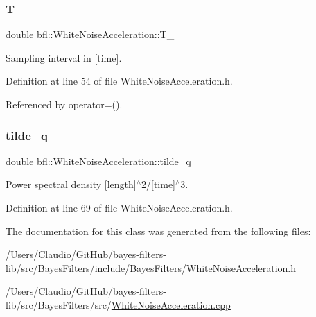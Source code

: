 \subsubsection{\texorpdfstring{T\+\_\+}{T\_}}
{\footnotesize\ttfamily double bfl\+::\+White\+Noise\+Acceleration\+::\+T\+\_\+\hspace{0.3cm}{\ttfamily [protected]}}



Sampling interval in \mbox{[}time\mbox{]}. 



Definition at line 54 of file White\+Noise\+Acceleration.\+h.



Referenced by operator=().

\mbox{\label{classbfl_1_1WhiteNoiseAcceleration_ab65b133705fba509b0cf3675379573e6}} 
\subsubsection{\texorpdfstring{tilde\+\_\+q\+\_\+}{tilde\_q\_}}
{\footnotesize\ttfamily double bfl\+::\+White\+Noise\+Acceleration\+::tilde\+\_\+q\+\_\+\hspace{0.3cm}{\ttfamily [protected]}}



Power spectral density \mbox{[}length\mbox{]}$^\wedge$2/\mbox{[}time\mbox{]}$^\wedge$3. 



Definition at line 69 of file White\+Noise\+Acceleration.\+h.



The documentation for this class was generated from the following files\+:\begin{DoxyCompactItemize}
\item 
/\+Users/\+Claudio/\+Git\+Hub/bayes-\/filters-\/lib/src/\+Bayes\+Filters/include/\+Bayes\+Filters/\mbox{\hyperlink{WhiteNoiseAcceleration_8h}{White\+Noise\+Acceleration.\+h}}\item 
/\+Users/\+Claudio/\+Git\+Hub/bayes-\/filters-\/lib/src/\+Bayes\+Filters/src/\mbox{\hyperlink{WhiteNoiseAcceleration_8cpp}{White\+Noise\+Acceleration.\+cpp}}\end{DoxyCompactItemize}
